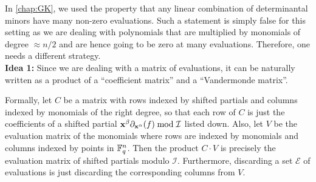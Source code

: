 In \autoref{chap:GK}, we used the property that any linear combination of determinantal minors have many non-zero evaluations. Such a statement is simply false for this setting as we are dealing with polynomials that are multiplied by monomials of degree $\approx n/2$ and are hence going to be zero at many evaluations. Therefore, one needs a different strategy. \\

{\bf Idea 1:} Since we are dealing with a matrix of evaluations, it can be naturally written as a product of a ``coefficient matrix'' and a ``Vandermonde matrix''.


Formally, let $C$ be  a matrix with rows indexed by shifted partials and columns indexed by monomials of the right degree, so that each row of $C$ is just the coefficients of a shifted partial $\mathbf{x}^{\beta} \partial_{\mathbf{x}^\alpha}(f) \bmod \mathcal{I}$ listed down. Also, let $V$ be the evaluation matrix of the monomials where rows are indexed by monomials and columns indexed by points in $\mathbb{F}_q^n$. Then the product $C \cdot V$ is precisely the evaluation matrix of shifted partials modulo $\mathcal{I}$. Furthermore, discarding a set $\mathcal{E}$ of evaluations is just discarding the corresponding columns from $V$. 

